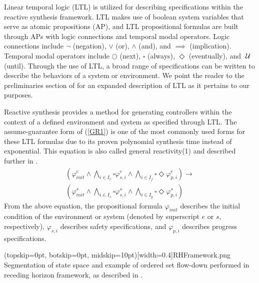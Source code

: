 \documentclass{ieeeaccess}
\newcommand{\always}{\square}
\newcommand{\eventually}{\Diamond}
\newcommand{\next}{\bigcirc}
\newcommand{\until}{\hspace{1mm}\mathcal{U}\hspace{1mm}}
\begin{document}
Linear temporal logic (LTL) is utilized for describing specifications within the reactive synthesis framework. LTL makes use of boolean system variables that serve as atomic propositions (AP), and LTL propositional formulas are built through APs with logic connections and temporal modal operators. Logic connections include $\lnot$ (negation), $\lor$ (or), $\land$ (and),  and $\implies$ (implication). Temporal modal operators include $\next$ (next), $\always$ (always), $\eventually$ (eventually), and $\until$ (until). Through the use of LTL, a broad range of specifications can be written to describe the behaviors of a system or environment. We point the reader to the preliminaries section of \cite{c7} for an expanded description of LTL as it pertains to our purposes.

Reactive synthesis provides a method for generating controllers within the context of a defined environment and system as specified through LTL.  The assume-guarantee form of (\ref{GR1}) is one of the most commonly used forms for these LTL formulas due to its proven polynomial synthesis time instead of exponential. This equation is also called general reactivity(1) and described further in \cite{c7}.
\begin{equation}
\label{GR1}
\begin{aligned}
(\varphi_{init}^{e} \land \bigwedge_{i \in I_r} \always \varphi_{s,i}^{e} \land \bigwedge_{i \in I_f} \always \eventually \varphi_{p,i}^{e}) \longrightarrow \\ (\varphi_{init}^{s} \land \bigwedge_{i \in I_s} \always \varphi_{s,i}^{s} \land \bigwedge_{i \in I_g} \always \eventually \varphi_{p,i}^{s})
\end{aligned}
\end{equation}
From the above equation, the propositional formula $\varphi_{init}$  describes the initial condition of the environment or system (denoted by superscript $e$ or $s$, respectively), $\varphi_{s,i}$  describes safety specifications, and $\varphi_{p,i}$ describes progress specifications.

\Figure[t!](topskip=0pt, botskip=0pt, midskip=10pt)[width=0.4\textwidth]{RHFramework.png}
{Segmentation of state space and example of ordered set flow-down performed in receding horizon framework, as described in \cite{c10}.\label{RhFrame}}
\end{document}
